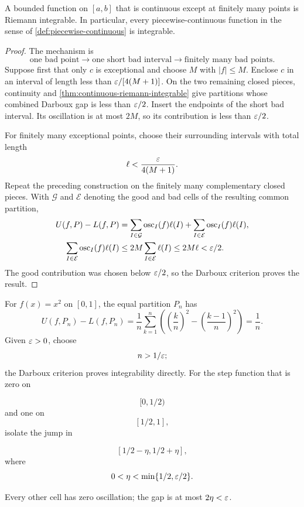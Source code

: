 \begin{theorem}
\label{thm:finite-discontinuities-integrable}
A bounded function on $[a,b]$ that is continuous except at finitely many
points is Riemann integrable. In particular, every piecewise-continuous
function in the sense of \cref{def:piecewise-continuous} is integrable.
\end{theorem}
\begin{proof}
The mechanism is
\[
\boxed{\text{one bad point}\longrightarrow\text{one short bad interval}
\longrightarrow\text{finitely many bad points}.}
\]
Suppose first that only $c$ is exceptional and choose $M$ with
$|f|\leq M$. Enclose $c$ in an interval of length less than
$\varepsilon/[4(M+1)]$. On the two remaining closed pieces, continuity and
\cref{thm:continuous-riemann-integrable} give partitions whose combined
Darboux gap is less than $\varepsilon/2$. Insert the endpoints of the short bad
interval. Its oscillation is at most $2M$, so its contribution is less
than $\varepsilon/2$.

For finitely many exceptional points, choose their surrounding intervals
with total length
\[
\ell<\frac{\varepsilon}{4(M+1)}.
\]
Repeat the preceding construction on the finitely many complementary
closed pieces. With $\mathcal G$ and $\mathcal E$ denoting the good and bad
cells of the resulting common partition,
\[
\begin{aligned}
U(f,P)-L(f,P)
&=\sum_{I\in\mathcal G}\operatorname{osc}_I(f)\ell(I)
 +\sum_{I\in\mathcal E}\operatorname{osc}_I(f)\ell(I),\\
\sum_{I\in\mathcal E}\operatorname{osc}_I(f)\ell(I)
&\leq2M\sum_{I\in\mathcal E}\ell(I)\leq2M\ell<\varepsilon/2.
\end{aligned}
\]
The good contribution was chosen below $\varepsilon/2$, so the Darboux criterion
proves the result.
\end{proof}

\begin{example}
For $f(x)=x^2$ on $[0,1]$, the equal partition $P_n$ has
\[
U(f,P_n)-L(f,P_n)
=\frac1n\sum_{k=1}^n
\left(\left(\frac kn\right)^2-\left(\frac{k-1}{n}\right)^2\right)
=\frac1n.
\]
Given $\varepsilon>0$, choose
\[
n>1/\varepsilon;
\]
 the Darboux criterion proves
integrability directly. For the step function that is zero on

\[
[0,1/2)
\]
 and one on
\[
[1/2,1],
\]
 isolate the jump in

\[
[1/2-\eta,1/2+\eta],
\]
 where
\[
0<\eta<\min\{1/2,\varepsilon/2\}.
\]

Every other cell has zero oscillation; the gap is at most $2\eta<\varepsilon$.
\end{example}


